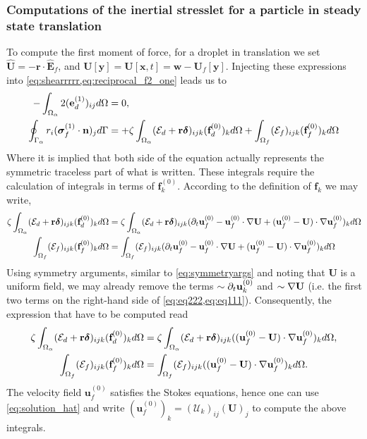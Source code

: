\subsubsection{Computations of the inertial stresslet for a particle in steady state translation}

To compute the first moment of force, for a droplet in translation we set $\hat{\textbf{U}} = - \textbf{r} \cdot \hat{\textbf{E}}_f$, and $\textbf{U}[\textbf{y}] = \textbf{U}[\textbf{x},t] = \textbf{w} - \textbf{U}_f[\textbf{y}]$. 
Injecting these expressions into \ref{eq:shearrrrr,eq:reciprocal_f2_one} leads us to
\begin{align}
    - \intO{
        2(\textbf{e}_d^{(1)})_{ij}
   }
    &= 0, \\
    \intS{r_i (\bm\sigma_f^{(1)} \cdot \textbf{n})_j}
    &= 
    + \zeta\intO{(\mathcal{E}_d + \textbf{r}\bm\delta)_{ijk} (\textbf{f}_d^{(0)})_k }
    + \intOf{(\mathcal{E}_f )_{ijk}  (\textbf{f}^{(0)}_f)_k}
    \label{eq:stresslet}
\end{align}
Where it is implied that both side of the equation actually represents the symmetric traceless part of what is written.
These integrals require the calculation of integrals in terms of $\textbf{f}^{(0)}_k$. 
According to the definition of $\textbf{f}_k$ we may write, 
\begin{align}
    \label{eq:eq111}
    \zeta\intO{(\mathcal{E}_d + \textbf{r}\bm\delta)_{ijk} (\textbf{f}_d^{(0)})_k }
    &=
    \zeta\intO{(\mathcal{E}_d + \textbf{r}\bm\delta)_{ijk} 
    (
    \pddt \textbf{u}_f^{(0)}
    - \textbf{u}_f^{(0)} \cdot \grad \textbf{U}
    + (\textbf{u}_f^{(0)} - \textbf{U})\cdot \grad \textbf{u}_f^{(0)}
    )_k }\\
    \intOf{(\mathcal{E}_f )_{ijk}  (\textbf{f}^{(0)}_f)_k}
    &=
    \intOf{(\mathcal{E}_f )_{ijk}  
    (\pddt \textbf{u}_f^{(0)}
    - \textbf{u}_f^{(0)} \cdot \grad \textbf{U}
    + (\textbf{u}_f^{(0)} - \textbf{U})\cdot \grad \textbf{u}_f^{(0)}
    )_k}
    \label{eq:eq222}
\end{align}
Using symmetry arguments, similar to \ref{eq:symmetryargs} and noting that  \textbf{U} is a uniform field, we may already remove the terms $\sim \partial_t \textbf{u}^{(0)}_k$ and $\sim \mathbf{\nabla} \textbf{U}$ (i.e. the first two terms on the right-hand side of \ref{eq:eq222,eq:eq111}). 
Consequently, the expression that have to be computed read
\begin{align}
    \zeta\intO{(\mathcal{E}_d + \textbf{r}\bm\delta)_{ijk} (\textbf{f}_d^{(0)})_k }
    &=
    \zeta\intO{(\mathcal{E}_d + \textbf{r}\bm\delta)_{ijk} 
    ( (\textbf{u}_f^{(0)} - \textbf{U})\cdot \grad \textbf{u}_f^{(0)}
    )_k },
    \label{eq:eq111222}
    \\
    \intOf{(\mathcal{E}_f )_{ijk}  (\textbf{f}^{(0)}_f)_k}
    &=
    \intOf{(\mathcal{E}_f )_{ijk}  
    ((\textbf{u}_f^{(0)} - \textbf{U})\cdot \grad \textbf{u}_f^{(0)}
    )_k}. 
    \label{eq:eq222222222}
\end{align}
The velocity field $\textbf{u}_f^{(0)}$ satisfies the Stokes equations, hence one can use \ref{eq:solution_hat} and write $(\textbf{u}_f^{(0)})_k = (\mathcal{U}_k)_{ij}(\textbf{U})_j$ to compute the above integrals. 

